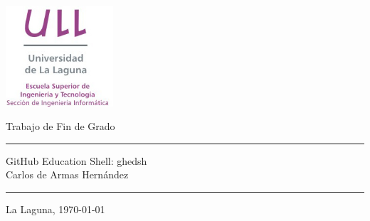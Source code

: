 \documentclass[spanish,a4paper,14pt,oneside]{extreport}
\begin{document}
\renewcommand\listtablename{Índice de Tablas}      %
\renewcommand\listfigurename{Índice de Figuras}    %


\pagestyle{empty}
\thispagestyle{empty}


\newcommand{\HRule}{\rule{\linewidth}{1mm}}
\setlength{\parindent}{0mm}
\setlength{\parskip}{0mm}


\begin{center}
	\includegraphics[width=0.3\textwidth]{images/logo_vertical}
\end{center}

\begin{center}
{\Huge Trabajo de Fin de Grado}
\end{center}

\HRule
\begin{flushright}
        {\Huge GitHub Education Shell: ghedsh} \\[2.5mm]
        {\Large Carlos de Armas Hernández} \\[5mm]


\end{flushright}
\HRule
{}
\begin{center}
  \Large La Laguna, \today
\end{center}

\setlength{\parindent}{5mm}

\newpage
\thispagestyle{empty}
\end{document}
